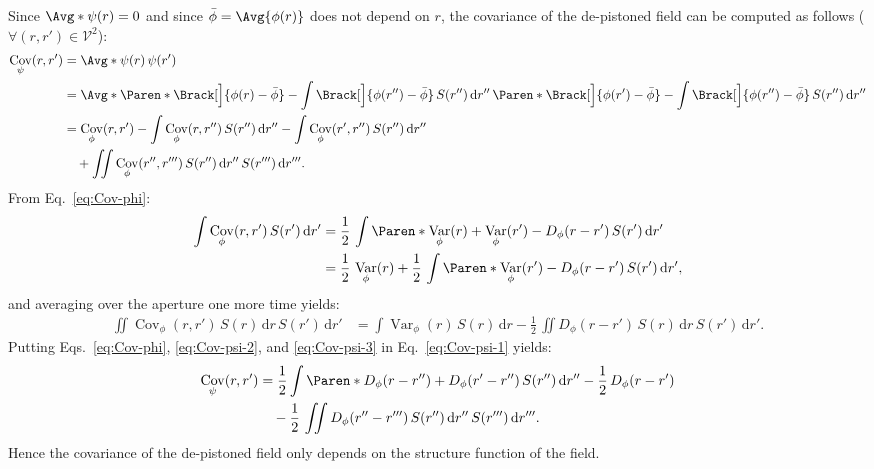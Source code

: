 \documentclass{article}
\DeclareMathOperator{\Var}{Var}
\DeclareMathOperator{\Cov}{Cov}
\begin{document}
Since $\Avg*{\psi(r)} = 0$ and since $\bar{\phi} = \Avg{\phi(r)}$ does not depend on $r$,
the covariance of the de-pistoned field can be computed as follows
($\forall (r,r') \in \mathcal{V}^{2}$):
\begin{align}
  \Cov_{\psi}(r,r')
  &= \Avg*{\psi(r)\,\psi(r')} \notag \\
  &= \Avg*{\Paren*{\Brack[\Big]{\phi(r) - \bar{\phi}} - \int \Brack[\Big]{\phi(r'') - \bar{\phi}} \,S(r'')\,\mathrm{d}r''}\,
    \Paren*{\Brack[\Big]{\phi(r') - \bar{\phi}} - \int \Brack[\Big]{\phi(r'') - \bar{\phi}}\,S(r'')\,\mathrm{d}r''}} \notag \\
  &= \Cov_{\phi}(r,r')
    - \int \Cov_{\phi}(r,r'')\,S(r'')\,\mathrm{d}r''
    - \int \Cov_{\phi}(r',r'')\,S(r'')\,\mathrm{d}r'' \notag\\
  &\quad + \iint \Cov_{\phi}(r'',r''')\,S(r'')\,\mathrm{d}r''\,S(r''')\,\mathrm{d}r'''.
    \label{eq:Cov-psi-1}
\end{align}
From Eq.~\eqref{eq:Cov-phi}:
\begin{align}
  \int \Cov_{\phi}(r,r')\,S(r')\,\mathrm{d}r'
  &= \frac{1}{2}\,\int \Paren*{
    \Var_{\phi}(r) + \Var_{\phi}(r') - D_{\phi}(r - r')
    }\,S(r')\,\mathrm{d}r'\notag\\
  &= \frac{1}{2}\,\Var_{\phi}(r)
    + \frac{1}{2}\,\int \Paren*{
    \Var_{\phi}(r') - D_{\phi}(r - r')}\,S(r')\,\mathrm{d}r',
    \label{eq:Cov-psi-2}
\end{align}
and averaging over the aperture one more time yields:
\begin{align}
  \iint \Cov_{\phi}(r,r')\,S(r)\,\mathrm{d}r\,S(r')\,\mathrm{d}r'
  &= \int \Var_{\phi}(r)\,S(r)\,\mathrm{d}r
  - \frac{1}{2}\,\iint D_{\phi}(r - r')\,S(r)\,\mathrm{d}r\,S(r')\,\mathrm{d}r'.
    \label{eq:Cov-psi-3}
\end{align}
Putting Eqs.~\eqref{eq:Cov-phi}, \eqref{eq:Cov-psi-2}, and \eqref{eq:Cov-psi-3}
in Eq.~\eqref{eq:Cov-psi-1} yields:
\begin{align}
  \Cov_{\psi}(r,r')
  &= \frac{1}{2} \int \Paren*{D_{\phi}(r - r'') + D_{\phi}(r' - r'')}\,S(r'')\,\mathrm{d}r''
    - \frac{1}{2} \, D_{\phi}(r - r') \notag\\
  &\quad - \frac{1}{2}\,\iint D_{\phi}(r'' - r''')\,S(r'')\,\mathrm{d}r''\,S(r''')\,\mathrm{d}r'''.
    \label{eq:Cov-psi-4}
\end{align}
Hence the covariance of the de-pistoned field only depends on the structure
function of the field.
\end{document}
